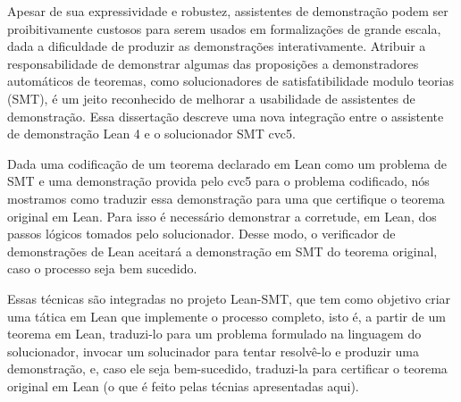 Apesar de sua expressividade e robustez, assistentes
de demonstra\c{c}\~ao podem ser proibitivamente custosos
para serem usados em formaliza\c{c}\~oes de grande escala,
dada a dificuldade de produzir as demonstra\c{c}\~oes
interativamente.
%
Atribuir a responsabilidade de demonstrar algumas das
proposi\c{c}\~oes a demonstradores autom\'aticos de teoremas,
como solucionadores de satisfatibilidade modulo teorias (SMT),
\'e um jeito reconhecido de melhorar a usabilidade de
assistentes de demonstra\c{c}\~ao.
%
Essa disserta\c{c}\~ao descreve uma nova integra\c{c}\~ao
entre o assistente de demonstra\c{c}\~ao Lean 4 e o
solucionador SMT cvc5.

Dada uma codifica\c{c}\~ao de um teorema declarado em Lean como um
problema de SMT e uma demonstra\c{c}\~ao provida pelo cvc5 para
o problema codificado, n\'os mostramos como traduzir essa
demonstra\c{c}\~ao para uma que certifique o teorema original em
Lean.
%
Para isso \'e necess\'ario demonstrar a corretude, em Lean, dos
passos l\'ogicos tomados pelo solucionador. Desse modo, o
verificador de demonstra\c{c}\~oes de Lean aceitar\'a a
demonstra\c{c}\~ao em SMT do teorema original, caso o processo
seja bem sucedido.

Essas t\'ecnicas s\~ao integradas no projeto Lean-SMT,
que tem como objetivo criar uma t\'atica em Lean que implemente
o processo completo, isto \'e, a partir de um teorema em Lean,
traduzi-lo para um problema formulado na linguagem do solucionador,
invocar um solucinador para tentar resolv\^e-lo e produzir
uma demonstra\c{c}\~ao, e, caso ele seja bem-sucedido,
traduzi-la para certificar o teorema original em Lean (o que
\'e feito pelas t\'ecnias apresentadas aqui).
